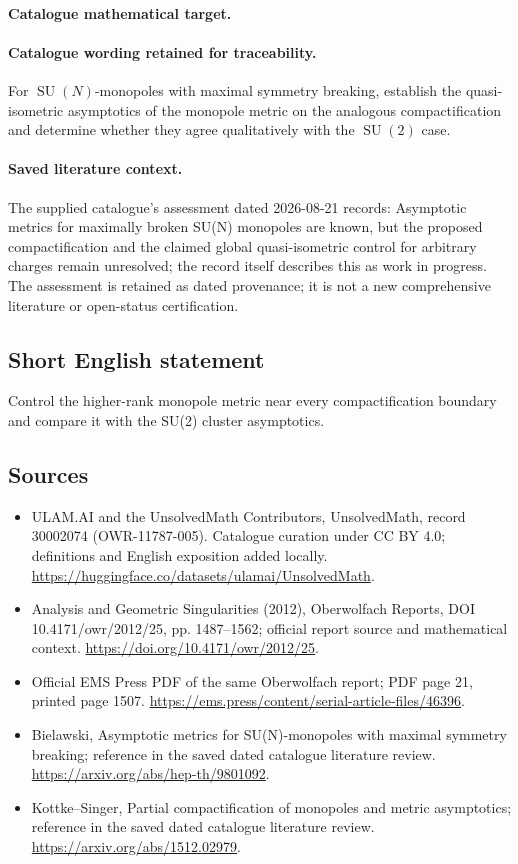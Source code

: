\documentclass[11pt]{article}
\begin{document}
\paragraph{Catalogue mathematical target.}
\paragraph{Catalogue wording retained for traceability.}
For $\operatorname{SU}(N)$-monopoles with maximal symmetry breaking, establish the quasi-isometric asymptotics of the monopole metric on the analogous compactification and determine whether they agree qualitatively with the $\operatorname{SU}(2)$ case.

\paragraph{Saved literature context.} The supplied catalogue's assessment dated 2026-08-21 records: Asymptotic metrics for maximally broken SU(N) monopoles are known, but the proposed compactification and the claimed global quasi-isometric control for arbitrary charges remain unresolved; the record itself describes this as work in progress. The assessment is retained as dated provenance; it is not a new comprehensive literature or open-status certification.
\subsection{Short English statement}
Control the higher-rank monopole metric near every compactification boundary and compare it with the SU(2) cluster asymptotics.
\subsection{Sources}
\begin{itemize}
\item[\hypertarget{source:30002074:1}{S1}] ULAM.AI and the UnsolvedMath Contributors, UnsolvedMath, record 30002074 (OWR-11787-005). Catalogue curation under CC BY 4.0; definitions and English exposition added locally.
\url{https://huggingface.co/datasets/ulamai/UnsolvedMath}.
\item[\hypertarget{source:30002074:2}{S2}] Analysis and Geometric Singularities (2012), Oberwolfach Reports, DOI 10.4171/owr/2012/25, pp. 1487--1562; official report source and mathematical context.
\url{https://doi.org/10.4171/owr/2012/25}.
\item[\hypertarget{source:30002074:3}{S3}] Official EMS Press PDF of the same Oberwolfach report; PDF page 21, printed page 1507.
\url{https://ems.press/content/serial-article-files/46396}.
\item[\hypertarget{source:30002074:4}{S4}] Bielawski, Asymptotic metrics for SU(N)-monopoles with maximal symmetry breaking; reference in the saved dated catalogue literature review.
\url{https://arxiv.org/abs/hep-th/9801092}.
\item[\hypertarget{source:30002074:5}{S5}] Kottke--Singer, Partial compactification of monopoles and metric asymptotics; reference in the saved dated catalogue literature review.
\url{https://arxiv.org/abs/1512.02979}.
\end{itemize}
\label{end:30002074}
\end{document}
